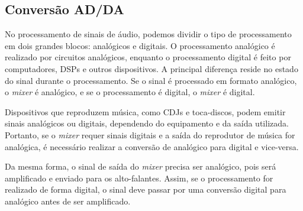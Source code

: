 \subsection{Conversão AD/DA}

No processamento de sinais de áudio, podemos dividir o tipo de processamento em dois grandes blocos: analógicos e digitais. O processamento analógico é realizado por circuitos analógicos, enquanto o processamento digital é feito por computadores, DSPs e outros dispositivos. A principal diferença reside no estado do sinal durante o processamento. Se o sinal é processado em formato analógico, o \textit{mixer} é analógico, e se o processamento é digital, o \textit{mixer} é digital.

Dispositivos que reproduzem música, como CDJs e toca-discos, podem emitir sinais analógicos ou digitais, dependendo do equipamento e da saída utilizada. Portanto, se o \textit{mixer} requer sinais digitais e a saída do reprodutor de música for analógica, é necessário realizar a conversão de analógico para digital e vice-versa.

Da mesma forma, o sinal de saída do \textit{mixer} precisa ser analógico, pois será amplificado e enviado para os alto-falantes. Assim, se o processamento for realizado de forma digital, o sinal deve passar por uma conversão digital para analógico antes de ser amplificado.